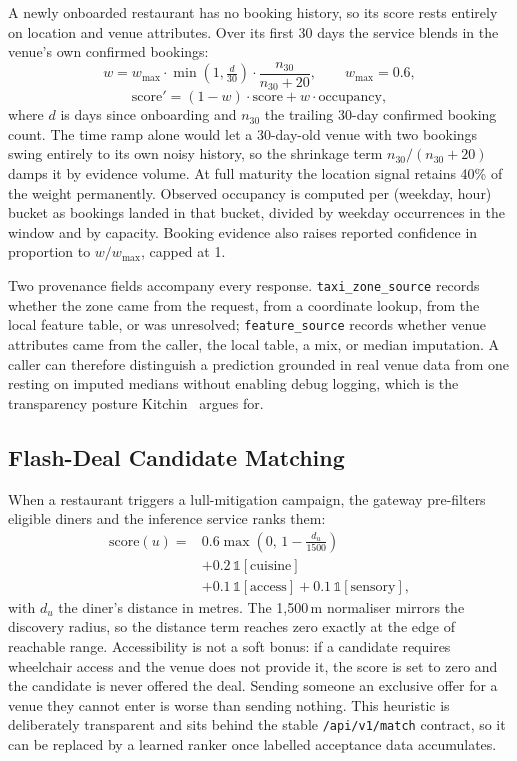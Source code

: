 \documentclass[conference]{IEEEtran}
\begin{document}
A newly onboarded restaurant has no booking history, so its score rests entirely on location and venue attributes. Over its first 30 days the service blends in the venue's own confirmed bookings:
\begin{equation}
w = w_{\max}\cdot \min\!\left(1, \tfrac{d}{30}\right)\cdot \frac{n_{30}}{n_{30}+20}, \qquad w_{\max}=0.6,
\end{equation}
\begin{equation}
\text{score}' = (1-w)\cdot\text{score} + w\cdot\text{occupancy},
\end{equation}
where $d$ is days since onboarding and $n_{30}$ the trailing 30-day confirmed booking count. The time ramp alone would let a 30-day-old venue with two bookings swing entirely to its own noisy history, so the shrinkage term $n_{30}/(n_{30}+20)$ damps it by evidence volume. At full maturity the location signal retains 40\% of the weight permanently. Observed occupancy is computed per (weekday, hour) bucket as bookings landed in that bucket, divided by weekday occurrences in the window and by capacity. Booking evidence also raises reported confidence in proportion to $w/w_{\max}$, capped at 1.

Two provenance fields accompany every response. \texttt{taxi\_zone\_source} records whether the zone came from the request, from a coordinate lookup, from the local feature table, or was unresolved; \texttt{feature\_source} records whether venue attributes came from the caller, the local table, a mix, or median imputation. A caller can therefore distinguish a prediction grounded in real venue data from one resting on imputed medians without enabling debug logging, which is the transparency posture Kitchin~\cite{b9} argues for.

\subsection{Flash-Deal Candidate Matching}

When a restaurant triggers a lull-mitigation campaign, the gateway pre-filters eligible diners and the inference service ranks them:
\begin{equation}
\begin{split}
\mathrm{score}(u) = {}& 0.6\max\!\left(0,\, 1-\tfrac{d_u}{1500}\right)\\
&+ 0.2\,\mathbb{1}[\text{cuisine}]\\
&+ 0.1\,\mathbb{1}[\text{access}] + 0.1\,\mathbb{1}[\text{sensory}],
\end{split}
\end{equation}
with $d_u$ the diner's distance in metres. The 1{,}500\,m normaliser mirrors the discovery radius, so the distance term reaches zero exactly at the edge of reachable range. Accessibility is not a soft bonus: if a candidate requires wheelchair access and the venue does not provide it, the score is set to zero and the candidate is never offered the deal. Sending someone an exclusive offer for a venue they cannot enter is worse than sending nothing. This heuristic is deliberately transparent and sits behind the stable \texttt{/api/v1/match} contract, so it can be replaced by a learned ranker once labelled acceptance data accumulates.
\end{document}
